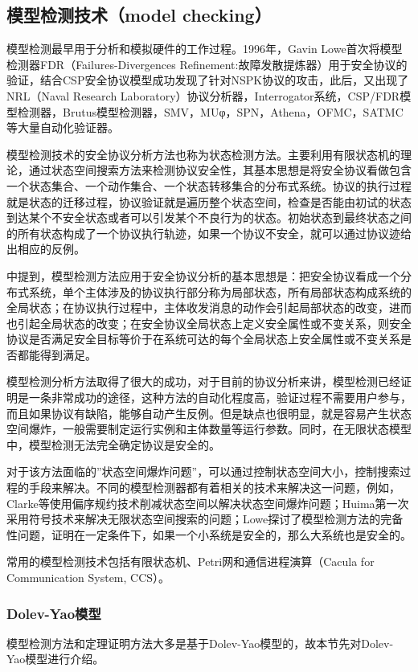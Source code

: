 \documentclass[cs4size,a4pape,UTF8]{ctexart}
\numberwithin{equation}{section}
\numberwithin{table}{section}
\numberwithin{figure}{section}
\begin{document}
\subsection{模型检测技术（model checking）}

模型检测最早用于分析和模拟硬件的工作过程。1996年，Gavin Lowe首次将模型检测器FDR（Failures-Divergences Refinement:故障发散提炼器）用于安全协议的验证，结合CSP安全协议模型成功发现了针对NSPK协议的攻击，此后，又出现了NRL（Naval Research Laboratory）协议分析器，Interrogator系统，CSP/FDR模型检测器，Brutus模型检测器，SMV，MUφ，SPN，Athena，OFMC，SATMC等大量自动化验证器\cite{1}\cite{5}\cite{6}。

模型检测技术的安全协议分析方法也称为状态检测方法。主要利用有限状态机的理论，通过状态空间搜索方法来检测协议安全性，其基本思想是将安全协议看做包含一个状态集合、一个动作集合、一个状态转移集合的分布式系统。协议的执行过程就是状态的迁移过程，协议验证就是遍历整个状态空间，检查是否能由初试的状态到达某个不安全状态或者可以引发某个不良行为的状态。初始状态到最终状态之间的所有状态构成了一个协议执行轨迹，如果一个协议不安全，就可以通过协议迹给出相应的反例\cite{2}\cite{6}。

\cite{book}中提到，模型检测方法应用于安全协议分析的基本思想是：把安全协议看成一个分布式系统，单个主体涉及的协议执行部分称为局部状态，所有局部状态构成系统的全局状态；在协议执行过程中，主体收发消息的动作会引起局部状态的改变，进而也引起全局状态的改变；在安全协议全局状态上定义安全属性或不变关系，则安全协议是否满足安全目标等价于在系统可达的每个全局状态上安全属性或不变关系是否都能得到满足。

模型检测分析方法取得了很大的成功，对于目前的协议分析来讲，模型检测已经证明是一条非常成功的途径，这种方法的自动化程度高，验证过程不需要用户参与，而且如果协议有缺陷，能够自动产生反例。但是缺点也很明显，就是容易产生状态空间爆炸，一般需要制定运行实例和主体数量等运行参数。同时，在无限状态模型中，模型检测无法完全确定协议是安全的\cite{1}。

对于该方法面临的''状态空间爆炸问题''，可以通过控制状态空间大小，控制搜索过程的手段来解决。不同的模型检测器都有着相关的技术来解决这一问题，例如，Clarke等使用偏序规约技术削减状态空间以解决状态空间爆炸问题；Huima第一次采用符号技术来解决无限状态空间搜索的问题；Lowe探讨了模型检测方法的完备性问题，证明在一定条件下，如果一个小系统是安全的，那么大系统也是安全的。

常用的模型检测技术包括有限状态机、Petri网和通信进程演算（Cacula for Communication System, CCS）。

\subsubsection{Dolev-Yao模型}
模型检测方法和定理证明方法大多是基于Dolev-Yao模型的，故本节先对Dolev-Yao模型进行介绍。
\end{document}
